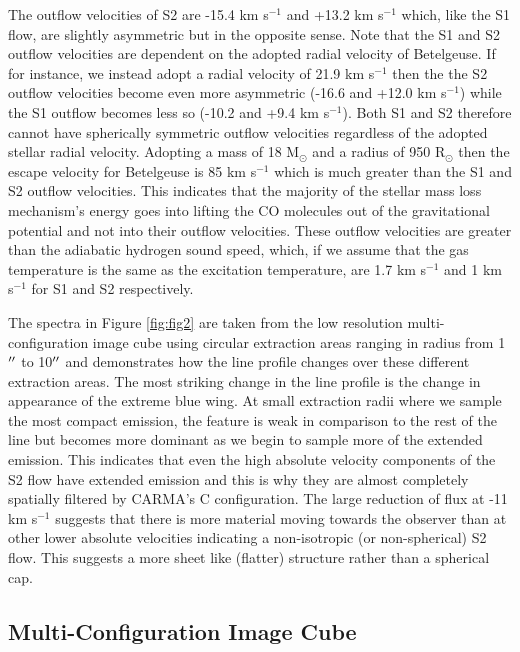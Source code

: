 \documentclass[iop]{emulateapj}
\begin{document}
The outflow velocities of S2 are -15.4 km s${}^{-1}$ and +13.2 km s${}^{-1}$ which, like the S1 flow, are slightly asymmetric but in the opposite sense. Note that the S1 and S2 outflow velocities are dependent on the adopted radial velocity of Betelgeuse. If for instance, we instead adopt a radial velocity of 21.9 km s${}^{-1}$ \citep{2005A&A...430..165F} then the the S2 outflow velocities become even more asymmetric (-16.6 and +12.0 km s${}^{-1}$) while the S1 outflow becomes less so (-10.2 and +9.4 km s${}^{-1}$). Both S1 and S2 therefore cannot have spherically symmetric outflow velocities regardless of the adopted stellar radial velocity. Adopting a mass of 18 M$_{\odot}$ and a radius of 950 R$_{\odot}$ \citep{2008AJ....135.1430H} then the escape velocity for Betelgeuse is 85 km s${}^{-1}$ which is much greater than the S1 and S2 outflow velocities. This indicates that the majority of the stellar mass loss mechanism's energy goes into lifting the CO molecules out of the gravitational potential and not into their outflow velocities. These outflow velocities are greater than the adiabatic hydrogen sound speed, which, if we assume that the gas temperature is the same as the excitation temperature, are 1.7 km s${}^{-1}$ and 1 km s${}^{-1}$ for S1 and S2 respectively. 

The spectra in Figure \ref{fig:fig2} are taken from the low resolution multi-configuration image cube using circular extraction areas ranging in radius from 1$\mbox{$^{\prime\prime}$}$ to 10$\mbox{$^{\prime\prime}$}$ and demonstrates how the line profile changes over these different extraction areas. The most striking change in the line profile is the change in appearance of the extreme blue wing. At small extraction radii where we sample the most compact emission, the feature is weak in comparison to the rest of the line but becomes more dominant as we begin to sample more of the extended emission. This indicates that even the high absolute velocity components of the S2 flow have extended emission and this is why they are almost completely spatially filtered by CARMA's C configuration. The large reduction of flux at -11 km s$^{-1}$ suggests that there is more material moving towards the observer than at other lower absolute velocities indicating a non-isotropic (or non-spherical) S2 flow. This suggests a more sheet like (flatter) structure rather than a spherical cap.

\subsection{Multi-Configuration Image Cube} \label{results2} 
\end{document}
